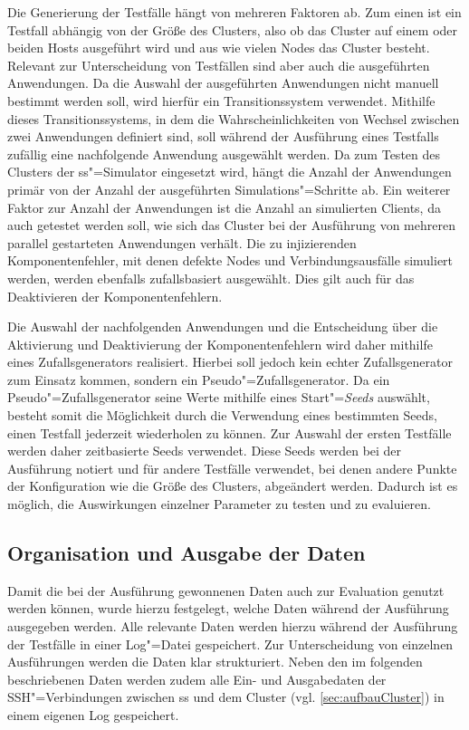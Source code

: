 Die Generierung der Testfälle hängt von mehreren Faktoren ab.
Zum einen ist ein Testfall abhängig von der Größe des Clusters, also ob das Cluster auf einem oder beiden Hosts ausgeführt wird und aus wie vielen Nodes das Cluster besteht.
Relevant zur Unterscheidung von Testfällen sind aber auch die ausgeführten Anwendungen.
Da die Auswahl der ausgeführten Anwendungen nicht manuell bestimmt werden soll, wird hierfür ein Transitionssystem verwendet.
Mithilfe dieses Transitionssystems, in dem die Wahrscheinlichkeiten von Wechsel zwischen zwei Anwendungen definiert sind, soll während der Ausführung eines Testfalls zufällig eine nachfolgende Anwendung ausgewählt werden.
Da zum Testen des Clusters der \ac{ss}"=Simulator eingesetzt wird, hängt die Anzahl der Anwendungen primär von der Anzahl der ausgeführten Simulations"=Schritte ab.
Ein weiterer Faktor zur Anzahl der Anwendungen ist die Anzahl an simulierten Clients, da auch getestet werden soll, wie sich das Cluster bei der Ausführung von mehreren parallel gestarteten Anwendungen verhält.
Die zu injizierenden Komponentenfehler, mit denen defekte Nodes und Verbindungsausfälle simuliert werden, werden ebenfalls zufallsbasiert ausgewählt.
Dies gilt auch für das Deaktivieren der Komponentenfehlern.

Die Auswahl der nachfolgenden Anwendungen und die Entscheidung über die Aktivierung und Deaktivierung der Komponentenfehlern wird daher mithilfe eines Zufallsgenerators realisiert.
Hierbei soll jedoch kein echter Zufallsgenerator zum Einsatz kommen, sondern ein Pseudo"=Zufallsgenerator.
Da ein Pseudo"=Zufallsgenerator seine Werte mithilfe eines Start"=\emph{Seeds} auswählt, besteht somit die Möglichkeit durch die Verwendung eines bestimmten Seeds, einen Testfall jederzeit wiederholen zu können.
Zur Auswahl der ersten Testfälle werden daher zeitbasierte Seeds verwendet.
Diese Seeds werden bei der Ausführung notiert und für andere Testfälle verwendet, bei denen andere Punkte der Konfiguration wie \zB die Größe des Clusters, abgeändert werden.
Dadurch ist es möglich, die Auswirkungen einzelner Parameter zu testen und zu evaluieren.

\subsection{Organisation und Ausgabe der Daten}
\label{sec:dataOrganisation}

Damit die bei der Ausführung gewonnenen Daten auch zur Evaluation genutzt werden können, wurde hierzu festgelegt, welche Daten während der Ausführung ausgegeben werden.
Alle relevante Daten werden hierzu während der Ausführung der Testfälle in einer Log"=Datei gespeichert.
Zur Unterscheidung von einzelnen Ausführungen werden die Daten klar strukturiert.
Neben den im folgenden beschriebenen Daten werden zudem alle Ein- und Ausgabedaten der SSH"=Verbindungen zwischen \ac{ss} und dem Cluster (vgl. \autoref{sec:aufbauCluster}) in einem eigenen Log gespeichert.

